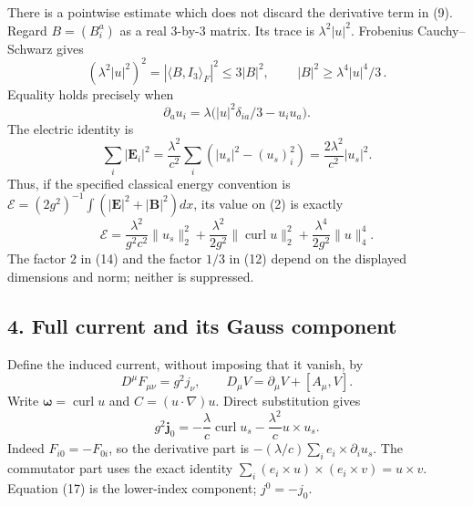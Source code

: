 \documentclass[
  11pt,
]{article}
\begin{document}
There is a pointwise estimate which does not discard the derivative term
in (9). Regard \(B=(B_i^a)\) as a real \(3\)-by-\(3\) matrix. Its trace
is \(\lambda^2|u|^2\). Frobenius Cauchy--Schwarz gives \[
 (\lambda^2|u|^2)^2=|\langle B,I_3\rangle_F|^2
 \le 3|B|^2,\qquad
 \boxed{\,|B|^2\ge \lambda^4|u|^4/3\,}.
 \tag{12}
\] Equality holds precisely when \[
 \partial_a u_i=
 \lambda\bigl(|u|^2\delta_{ia}/3-u_i u_a\bigr).
 \tag{13}
\] The electric identity is \[
 \sum_i|\mathbf E_i|^2
 =\frac{\lambda^2}{c^2}\sum_i(|u_s|^2-(u_s)_i^2)
 =\frac{2\lambda^2}{c^2}|u_s|^2.
 \tag{14}
\] Thus, if the specified classical energy convention is
\(\mathcal E=(2g^2)^{-1}\int(|\mathbf E|^2+|\mathbf B|^2)dx\), its value
on (2) is exactly \[
 \mathcal E=
 \frac{\lambda^2}{g^2c^2}\|u_s\|_2^2+
 \frac{\lambda^2}{2g^2}\|\operatorname{curl}u\|_2^2+
 \frac{\lambda^4}{2g^2}\|u\|_4^4.
 \tag{15}
\] The factor \(2\) in (14) and the factor \(1/3\) in (12) depend on the
displayed dimensions and norm; neither is suppressed.

\subsection{4. Full current and its Gauss
component}\label{weak-coupling-part-18-full-current-and-its-gauss-component}

Define the induced current, without imposing that it vanish, by \[
 D^\mu F_{\mu\nu}=g^2j_\nu,\qquad
 D_\mu V=\partial_\mu V+[A_\mu,V].
 \tag{16}
\] Write \(\boldsymbol\omega=\operatorname{curl}u\) and
\(C=(u\cdot\nabla)u\). Direct substitution gives \[
 \boxed{\ g^2\mathbf j_0
 =-\frac{\lambda}{c}\operatorname{curl}u_s
  -\frac{\lambda^2}{c}u\times u_s.\ }
 \tag{17}
\] Indeed \(F_{i0}=-F_{0i}\), so the derivative part is
\(-(\lambda/c)\sum_i e_i\times\partial_i u_s\). The commutator part uses
the exact identity \(\sum_i(e_i\times u)\times(e_i\times v)=u\times v\).
Equation (17) is the lower-index component; \(j^0=-j_0\).
\end{document}
